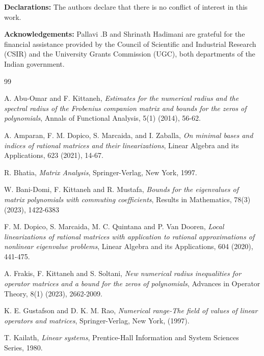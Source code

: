 \documentclass[12pt, reqno]{amsart}
\theoremstyle{definition}
\theoremstyle{remark}
\numberwithin{equation}{section}
\begin{document}
\medskip
\noindent
{\bf Declarations:} The authors declare that there is no conflict of interest in this work.

\noindent
{\bf Acknowledgements:} Pallavi .B and Shrinath Hadimani are grateful for the financial 
assistance provided by the Council of Scientific and Industrial Research (CSIR) and the 
University Grants Commission (UGC), both departments of the Indian government.


\begin{thebibliography}{99}

A. Abu-Omar and F. Kittaneh, \emph{Estimates for the numerical radius and the spectral 
radius of the {F}robenius companion matrix and bounds for the zeros of polynomials}, 
Annals of Functional Analysis, 5(1) (2014), 56-62.

A. Amparan, F. M. Dopico, S. Marcaida, and I. Zaballa, \emph{On minimal bases and indices 
of rational matrices and their linearizations}, Linear Algebra and its Applications, 
623 (2021), 14-67.

R. Bhatia, \emph{Matrix Analysis}, Springer-Verlag, New York, 1997.

W. Bani-Domi, F. Kittaneh and R. Mustafa, \emph{Bounds for the eigenvalues of 
matrix polynomials with commuting coefficients},  Results in Mathematics, 
78(3) (2023), 1422-6383

F. M. Dopico, S. Marcaida, M. C. Quintana and P. Van Dooren, \emph{Local linearizations 
of rational matrices with application to rational approximations of nonlinear eigenvalue 
problems}, Linear Algebra and its Applications, 604 (2020), 441-475.

A. Frakis, F. Kittaneh and S. Soltani, \emph{New numerical radius inequalities 
for operator matrices and a bound for the zeros of polynomials}, Advances in 
Operator Theory, 8(1) (2023), 2662-2009.

K. E. Gustafson and D. K. M. Rao, \emph{Numerical range-The field of values of linear 
operators and matrices}, Springer-Verlag, New York, (1997).


T. Kailath, \emph{Linear systems}, Prentice-Hall Information and System Sciences Series, 1980.


\end{thebibliography}
\end{document}
